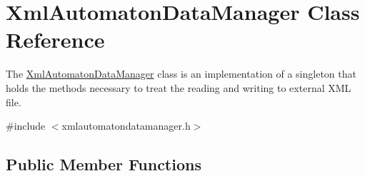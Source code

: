 \hypertarget{class_xml_automaton_data_manager}{}\section{Xml\+Automaton\+Data\+Manager Class Reference}
\label{class_xml_automaton_data_manager}


The \mbox{\hyperlink{class_xml_automaton_data_manager}{Xml\+Automaton\+Data\+Manager}} class is an implementation of a singleton that holds the methods necessary to treat the reading and writing to external X\+ML file.  




{\ttfamily \#include $<$xmlautomatondatamanager.\+h$>$}

\subsection*{Public Member Functions}
